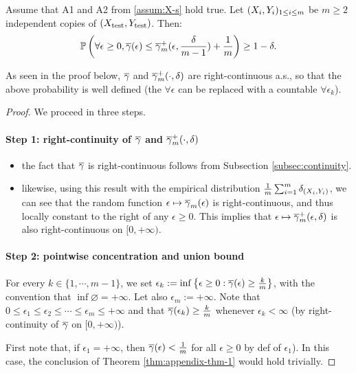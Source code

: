     \begin{theorem}
    \label{thm:appendix-thm-1}
        Assume that A1 and A2 from \ref{assum:X-s} hold true.
        Let $(X_i, Y_i)_{1\leq i \leq m}$ be $m\geq 2$ independent copies of $(X_\mathrm{test}, Y_\mathrm{test})$. Then:
        $$
            \mathbb{P}\left(\forall \epsilon\geq0, \overline{\gamma}(\epsilon)\leq\overline{\gamma}_{m}^{+}(\epsilon,\frac{\delta}{m-1})+\frac{1}{m}\right)\geq 1-\delta.
        $$
    \end{theorem}
    As seen in the proof below, $\overline{\gamma}$ and $\overline{\gamma}_{m}^{+}(\cdot, \delta)$ are right-continuous a.s., so that the above probability is well defined (the $\forall\epsilon$ can be replaced with a countable $\forall\epsilon_k$).
    \begin{proof}
        We proceed in three steps.
        \paragraph{Step 1: right-continuity of $\overline{\gamma}$ and $\overline{\gamma}_{m}^{+}(\cdot, \delta)$}
        \begin{itemize}
            \item the fact that $\overline{\gamma}$ is right-continuous follows from Subsection \ref{subsec:continuity}.
            \item likewise, using this result with the empirical distribution $\frac{1}{m}\sum_{i=1}^{m}\delta_{(X_i, Y_i)}$, we can see that the random function $\epsilon\mapsto\overline{\gamma}_{m}(\epsilon)$ is right-continuous, and thus locally constant to the right of any $\epsilon\geq0$. This implies that $\epsilon\mapsto\overline{\gamma}_{m}^{+}(\epsilon,\delta)$ is also right-continuous on $[0,+\infty)$.
        \end{itemize}

        \paragraph{Step 2: pointwise concentration and union bound}
        For every $k\in\{1,\cdots,m-1\}$, we set $\epsilon_k := \inf \left\{ \epsilon \geq 0 : \overline{\gamma}(\epsilon)\geq\frac{k}{m}\right\}$, with the convention that $\inf \varnothing = +\infty$. Let also $\epsilon_m := +\infty$.
        Note that $0\leq\epsilon_1\leq \epsilon_2 \leq \cdots\leq \epsilon_m\leq +\infty$ and that $\overline{\gamma}(\epsilon_k)\geq\frac{k}{m}$ whenever $\epsilon_k < \infty$ (by right-continuity of $\overline{\gamma}$ on $[0,+\infty)$).
        
        First note that, if $\epsilon_1=+\infty$, then $\overline{\gamma}(\epsilon)<\frac{1}{m}$ for all $\epsilon \geq 0$ by def of $\epsilon_1$). 
        In this case, the conclusion of Theorem \ref{thm:appendix-thm-1} would hold trivially.


\end{proof}
